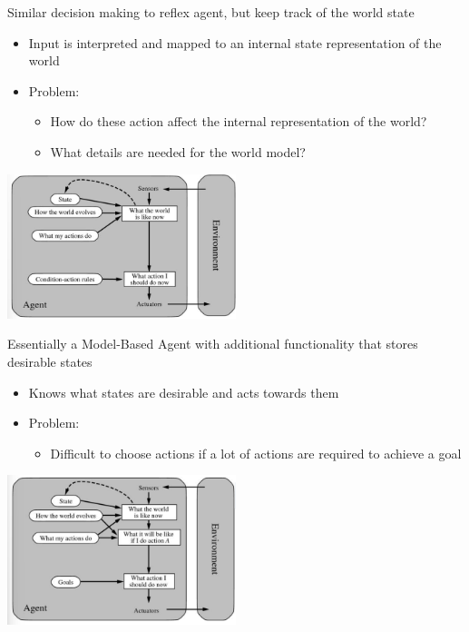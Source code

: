 \documentclass[
../../EiKI_Summary.tex,
]
{subfiles}
\begin{document}
\begin{defbox}
    Similar decision making to reflex agent, but keep track of the world state 
    \begin{itemize}
        \item Input is interpreted and mapped to an internal state representation of the world
        \item Problem: 
        \begin{itemize}
            \item How do these action affect the internal representation of the world?
            \item What details are needed for the world model?
        \end{itemize}
    \end{itemize}

    \begin{center}
        \includegraphics[width=0.5\textwidth]{Pics/ModelBasedAgent.png}
    \end{center}
\end{defbox}

\begin{defbox}
    Essentially a Model-Based Agent with additional functionality that stores desirable states
    \begin{itemize}
        \item Knows what states are desirable and acts towards them
        \item Problem:
        \begin{itemize}
            \item Difficult to choose actions if a lot of actions are required to achieve a goal
        \end{itemize}
    \end{itemize}

    \begin{center}
        \includegraphics[width=0.5\textwidth]{Pics/GoalBasedAgent.png}
    \end{center}
\end{defbox}
\end{document}
